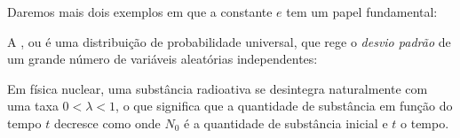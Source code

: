 Daremos mais dois exemplos em que a constante $e$ tem um papel fundamental:

\begin{ex}
A , ou  é uma
distribuição de
probabilidade universal, que rege o \emph{desvio padrão} de um grande número de
variáveis aleatórias independentes:
\begin{center}
\begin{bmlimage}\end{bmlimage}
\end{center}
\end{ex}

\begin{ex}
Em física nuclear, uma substância radioativa se desintegra
naturalmente com uma
taxa $0<\lambda<1$, o que significa que 
a quantidade de substância em função do tempo $t$ decresce como 
onde $N_0$ é a quantidade de substância inicial e $t$ o tempo.
\begin{center}
\begin{bmlimage}\end{bmlimage}
\end{center}
\end{ex}

